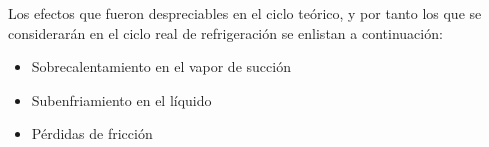 		
		Los efectos que fueron despreciables en el ciclo teórico, y por tanto los que se considerarán en el ciclo real de refrigeración se enlistan a continuación:
		\begin{itemize}
			\item Sobrecalentamiento en el vapor de succión
			\item Subenfriamiento en el líquido
			\item Pérdidas de fricción
			
			
		\end{itemize}